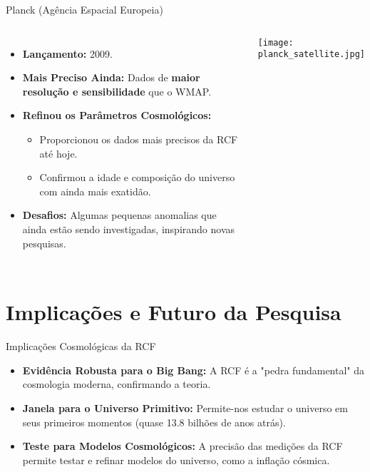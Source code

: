 \documentclass{beamer}
\begin{document}
\begin{frame}{Planck (Agência Espacial Europeia)}
    \begin{columns}
        \begin{itemize}
            \item \textbf{Lançamento:} 2009.
            \item \textbf{Mais Preciso Ainda:} Dados de \textbf{maior resolução e sensibilidade} que o WMAP.
            \item \textbf{Refinou os Parâmetros Cosmológicos:}
            \begin{itemize}
                \item Proporcionou os dados mais precisos da RCF até hoje.
                \item Confirmou a idade e composição do universo com ainda mais exatidão.
            \end{itemize}
            \item \textbf{Desafios:} Algumas pequenas anomalias que ainda estão sendo investigadas, inspirando novas pesquisas.
        \end{itemize}
        \begin{center}
            \texttt{[image: planck\_satellite.jpg]} %
            
            \tiny
        \end{center}
    \end{columns}
\end{frame}

\section{Implicações e Futuro da Pesquisa}

\begin{frame}{Implicações Cosmológicas da RCF}
    \begin{itemize}
        \item \textbf{Evidência Robusta para o Big Bang:} A RCF é a "pedra fundamental" da cosmologia moderna, confirmando a teoria.
        \item \textbf{Janela para o Universo Primitivo:} Permite-nos estudar o universo em seus primeiros momentos (quase 13.8 bilhões de anos atrás).
        \item \textbf{Teste para Modelos Cosmológicos:} A precisão das medições da RCF permite testar e refinar modelos do universo, como a inflação cósmica.
    \end{itemize}
\end{frame}
\end{document}
